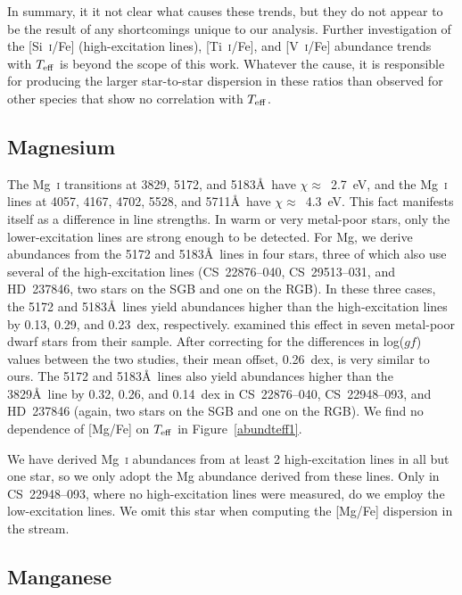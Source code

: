 \documentclass{emulateapj}
\begin{document}
In summary, it it not clear what causes these trends, 
but they do not appear to be the result of any 
shortcomings unique to our analysis.
Further investigation of the 
[Si~\textsc{i}/Fe] (high-excitation lines),
[Ti~\textsc{i}/Fe], and
[V~\textsc{i}/Fe] abundance trends with $T_{\rm eff}$ is beyond
the scope of this work.
Whatever the cause, it is responsible for producing the larger 
star-to-star dispersion in these ratios than observed
for other species that show no correlation with $T_{\rm eff}$.


\subsection{Magnesium}


The Mg~\textsc{i} transitions at 3829, 5172, and 5183\AA\ have
$\chi \approx$~2.7~eV, and the Mg~\textsc{i} 
lines at 4057, 4167, 4702,
5528, and 5711\AA\ have $\chi \approx$~4.3~eV.
This fact manifests itself as a difference in line strengths.
In warm or very metal-poor stars, only the lower-excitation lines
are strong enough to be detected.
For Mg, we derive abundances from the 5172 and 5183\AA\ lines
in four stars, three of which also use several of the high-excitation lines
(\mbox{CS~22876--040}, \mbox{CS~29513--031}, and \mbox{HD~237846},
two stars on the SGB and one on the RGB).
In these three cases, the 5172 and 5183\AA\ lines yield abundances
higher than the high-excitation lines 
by 0.13, 0.29, and 0.23~dex, respectively.
\citet{cohen04b} examined this effect in seven metal-poor dwarf stars
from their sample. 
After correcting for the differences in log($gf$) values between 
the two studies, their mean offset, 0.26~dex, is very similar to ours.
The 5172 and 5183\AA\ lines also yield abundances higher than the 
3829\AA\ line by 0.32, 0.26, and 0.14~dex in 
\mbox{CS~22876--040}, \mbox{CS~22948--093}, and \mbox{HD~237846}
(again, two stars on the SGB and one on the RGB).
We find no dependence of [Mg/Fe] on $T_{\rm eff}$ in Figure~\ref{abundteff1}.

We have derived Mg~\textsc{i} abundances from at least 2 high-excitation
lines in all but one star, so 
we only adopt the Mg abundance derived from these lines.
Only in \mbox{CS~22948--093}, where no high-excitation
lines were measured, do we employ the low-excitation lines.
We omit this star when computing the [Mg/Fe] dispersion in the stream.


\subsection{Manganese}
\label{mn}
\end{document}
